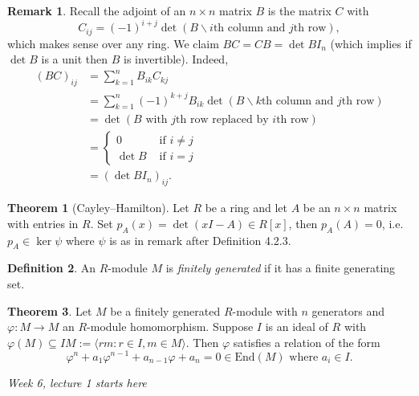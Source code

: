 \documentclass[a4paper]{article}
\newcommand{\End}{\text{End}}
\theoremstyle{definition}
\newtheorem{defn}{Definition}[subsection]
\newtheorem{thm}[defn]{Theorem}
\newtheorem*{remark}{Remark}
\begin{document}
\begin{remark}
Recall the adjoint of an $n\times n$ matrix $B$ is the matrix $C$ with 
\[
C_{ij}=(-1)^{i+j} \det \left(B\backslash i\text{th column and }j\text{th row} \right),
\]
which makes sense over any ring. We claim $BC=CB=\det B I_n$ (which implies if $\det B$ is a unit then $B$ is invertible). Indeed,
\[
\begin{aligned}
(BC)_{ij} &= \sum_{k=1}^n B_{ik} C_{kj}\\
&=\sum_{k=1}^n (-1)^{k+j} B_{ik} \det \left(B\backslash k\text{th column and }j\text{th row} \right)\\
&=\det \left(B\text{ with }j\text{th row replaced by }i\text{th row}\right)\\
&=\left\{ \begin{aligned}
  0 &\text{ if } i\neq j\\ \det B &\text{ if } i= j
\end{aligned} \right. \\
&=\left(\det B I_n\right)_{ij}.
\end{aligned}
\]
\end{remark}

\begin{thm}[Cayley–Hamilton]
Let $R$ be a ring and let $A$ be an $n\times n$ matrix with entries in $R$. Set $p_A(x)=\det (xI-A)\in R[x]$, then $p_A(A)=0$, i.e. $p_A\in\ker\psi$ where $\psi$ is as in remark after Definition 4.2.3.
\end{thm}

\begin{defn}
An $R$-module $M$ is \textit{finitely generated} if it has a finite generating set.
\end{defn}

\begin{thm}
Let $M$ be a finitely generated $R$-module with $n$ generators and $\varphi:M\rightarrow M$ an $R$-module homomorphism. Suppose $I$ is an ideal of $R$ with $\varphi(M)\subseteq IM:=\langle rm:r\in I,m\in M\rangle$. Then $\varphi$ satisfies a relation of the form
\[
\varphi^n + a_1 \varphi^{n-1} + a_{n-1}\varphi + a_n=0 \in\End(M) \text{ where } a_i\in I.
\]
\end{thm}

\begin{flushright}
\textit{Week 6, lecture 1 starts here}
\end{flushright}
\end{document}
